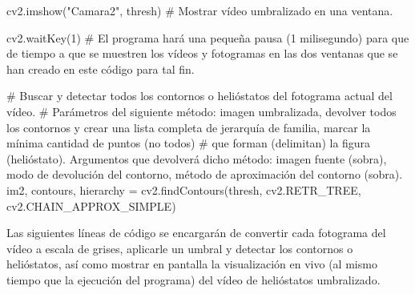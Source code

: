     cv2.imshow("Camara2", thresh) \# Mostrar vídeo umbralizado en una ventana.

    cv2.waitKey(1) \# El programa hará una pequeña pausa (1 milisegundo) para que de tiempo a que se muestren los vídeos y fotogramas en las dos ventanas que se han creado en este código para tal fin.

    \# Buscar y detectar todos los contornos o helióstatos del fotograma actual del vídeo.
    \# Parámetros del siguiente método: imagen umbralizada, devolver todos los contornos y crear una lista completa de jerarquía de familia, marcar la mínima cantidad de puntos (no todos)
    \# que forman (delimitan) la figura (helióstato). Argumentos que devolverá dicho método: imagen fuente (sobra), modo de devolución del contorno, método de aproximación del contorno (sobra).
    im2, contours, hierarchy = cv2.findContours(thresh, cv2.RETR\_TREE, cv2.CHAIN\_APPROX\_SIMPLE)

Las siguientes líneas de código se encargarán de convertir cada fotograma del vídeo a escala de grises, aplicarle un umbral y detectar los contornos o helióstatos, así como mostrar en pantalla la visualización en vivo (al mismo tiempo que la ejecución del programa) del vídeo de helióstatos umbralizado.

